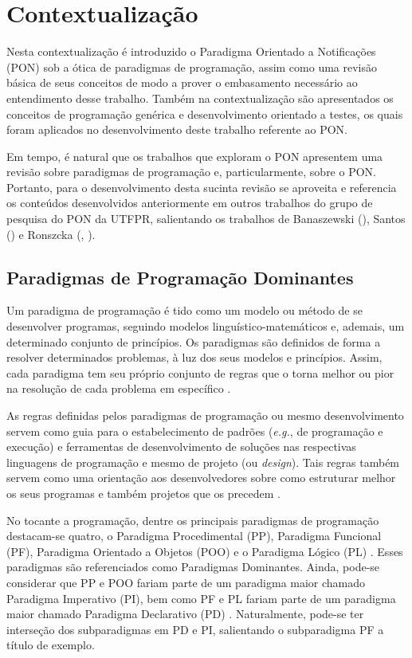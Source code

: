 \section{Contextualização}

Nesta contextualização é introduzido o Paradigma Orientado a Notificações (PON)
sob a ótica de paradigmas de programação, assim como uma revisão básica de seus
conceitos de modo a prover o embasamento necessário ao entendimento desse
trabalho. Também na contextualização são apresentados os conceitos de
programação genérica e desenvolvimento orientado a testes, os quais foram
aplicados no desenvolvimento deste trabalho referente ao PON.

Em tempo, é natural que os trabalhos que exploram o PON apresentem uma revisão
sobre paradigmas de programação e, particularmente, sobre o PON. Portanto, para
o desenvolvimento desta sucinta revisão se aproveita e referencia os conteúdos
desenvolvidos anteriormente em outros trabalhos do grupo de pesquisa do PON da
UTFPR, salientando os trabalhos de Banaszewski
(\citeyear{msc_Banaszewski_2009}), Santos (\citeyear{msc_santos_2017}) e
Ronszcka (\citeyear{msc_Ronszcka_2012}, \citeyear{doc_ronszcka_2019}).

\subsection{Paradigmas de Programação Dominantes}

Um paradigma de programação é tido como um modelo ou método de se desenvolver
programas, seguindo modelos linguístico-matemáticos e, ademais, um determinado
conjunto de princípios. Os paradigmas são definidos de forma a resolver
determinados problemas, à luz dos seus modelos e princípios. Assim, cada
paradigma tem seu próprio conjunto de regras que o torna melhor ou pior na
resolução de cada problema em específico \cite{van_roy_2012}.

As regras definidas pelos paradigmas de programação ou mesmo desenvolvimento
servem como guia para o estabelecimento de padrões (\textit{e.g.}, de
programação e execução) e ferramentas de desenvolvimento de soluções nas
respectivas linguagens de programação e mesmo de projeto (ou \textit{design}).
Tais regras também servem como uma orientação aos desenvolvedores sobre como
estruturar melhor os seus programas e também projetos que os precedem
\cite{van_roy_2004}.

No tocante a programação, dentre os principais paradigmas de programação
destacam-se quatro, o Paradigma Procedimental (PP), Paradigma Funcional (PF),
Paradigma Orientado a Objetos (POO) e o Paradigma Lógico (PL)
\cite{scott_2000,watt_2004,brookshear_2006}. Esses paradigmas são referenciados
como Paradigmas Dominantes. Ainda, pode-se considerar que PP e POO fariam parte
de um paradigma maior chamado Paradigma Imperativo (PI), bem como PF e PL fariam
parte de um paradigma maior chamado Paradigma Declarativo (PD)
\cite{gabbrielli_2010}. Naturalmente, pode-se ter interseção dos subparadigmas
em PD e PI, salientando o subparadigma PF a título de exemplo.

